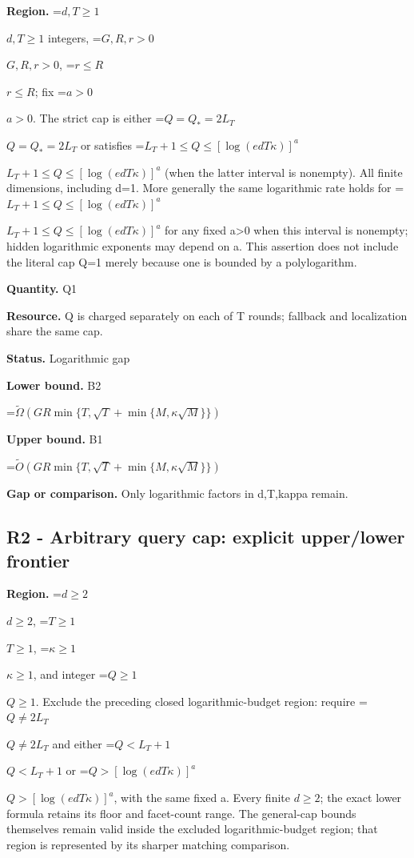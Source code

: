 \documentclass[10pt,a4paper]{article}
\newcommand{\AtlasMath}[1]{\par\begingroup\centering\setbox0=\hbox{$\displaystyle #1$}\ifdim\wd0>1.4\linewidth\typeout{ATLAS WIDE FORMULA: \the\wd0}\fi\ifdim\wd0>\linewidth\resizebox{\linewidth}{!}{\box0}\else\box0\fi\par\endgroup}
\newcommand{\AtlasInlineMath}[1]{\begingroup\setbox0=\hbox{$#1$}\ifdim\wd0>.4\linewidth\endgroup\AtlasMath{#1}\else\endgroup$#1$\fi}
\begin{document}
\textbf{Region.} \AtlasInlineMath{d,T\ge1} integers, \AtlasInlineMath{G,R,r>0}, \AtlasInlineMath{r\le R}; fix \AtlasInlineMath{a>0}. The strict cap is either \AtlasInlineMath{Q=Q_*=2L_T} or satisfies \AtlasInlineMath{L_T+1\le Q\le[\log(edT\kappa)]^a} (when the latter interval is nonempty). All finite dimensions, including d=1. More generally the same logarithmic rate holds for \AtlasInlineMath{L_T+1\le Q\le[\log(edT\kappa)]^a} for any fixed a>0 when this interval is nonempty; hidden logarithmic exponents may depend on a. This assertion does not include the literal cap Q=1 merely because one is bounded by a polylogarithm.



\textbf{Quantity.} Q1



\textbf{Resource.} Q is charged separately on each of T rounds; fallback and localization share the same cap.



\textbf{Status.} Logarithmic gap



\textbf{Lower bound.} B2



\AtlasMath{\widetilde\Omega(GR\min\{T,\sqrt T+\min\{M,\kappa\sqrt M\}\})}


\textbf{Upper bound.} B1



\AtlasMath{\widetilde O(GR\min\{T,\sqrt T+\min\{M,\kappa\sqrt M\}\})}


\textbf{Gap or comparison.} Only logarithmic factors in d,T,kappa remain.



\subsection{R2 - Arbitrary query cap: explicit upper/lower frontier}


\textbf{Region.} \AtlasInlineMath{d\ge2}, \AtlasInlineMath{T\ge1}, \AtlasInlineMath{\kappa\ge1}, and integer \AtlasInlineMath{Q\ge1}. Exclude the preceding closed logarithmic-budget region: require \AtlasInlineMath{Q\ne2L_T} and either \AtlasInlineMath{Q<L_T+1} or \AtlasInlineMath{Q>[\log(edT\kappa)]^a}, with the same fixed a. Every finite $d\ge 2$; the exact lower formula retains its floor and facet-count range. The general-cap bounds themselves remain valid inside the excluded logarithmic-budget region; that region is represented by its sharper matching comparison.
\end{document}
